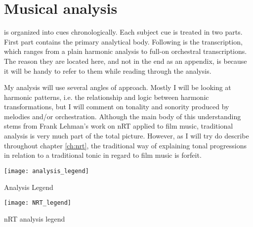 
\chapter{Musical analysis}\label{ch:musical analysis}

 is organized into cues chronologically. Each subject cue is treated in two parts. First part contains the primary analytical body. Following is the transcription, which ranges from a plain harmonic analysis to full-on orchestral transcriptions. The reason they are located here, and not in the end as an appendix, is because it will be handy to refer to them while reading through the analysis.

My analysis will use several angles of approach. Mostly I will be looking at harmonic patterns, i.e. the relationship and logic between harmonic transformations, but I will comment on tonality and sonority produced by melodies and/or orchestration. Although the main body of this understanding stems from Frank Lehman's work on \acf{nRT} applied to film music, traditional analysis is very much part of the total picture. However, as I will try do describe throughout chapter \ref{ch:nrt}, the traditional way of explaining tonal progressions in relation to a traditional tonic in regard to film music is forfeit.

\begin{marginfigure}
\texttt{[image: analysis\_legend]}
	\caption{Analysis Legend}
	\label{fg:analysis legend}
\end{marginfigure}

\begin{marginfigure}
\texttt{[image: NRT\_legend]}
	\caption{nRT analysis legend}
	\label{fb:nrt legend}
\end{marginfigure}


